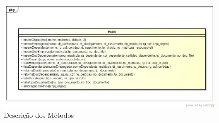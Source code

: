 	\begin{figure}[!htbp]
		\begin{center}
			\includegraphics[width=1\textwidth]{class_model}
		\end{center}
		\caption{Descrição dos Métodos}
		\label{fig:classmodel}
	\end{figure}

\renewcommand{\arraystretch}{3}

